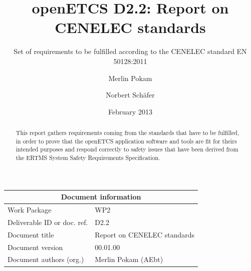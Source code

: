 \documentclass{template/openetcs_report}
\begin{document}
\frontmatter
{}




\title{openETCS D2.2: Report on CENELEC standards}

\subtitle{Set of requirements to be fulfilled according to the CENELEC standard EN 50128:2011}

\date{February 2013}

\author{Merlin Pokam \and Norbert Sch\"afer}






\begin{abstract}
This report gathers requirements coming from the standards that have to be fulfilled, in order to prove that the openETCS application software and tools are fit for theirs intended purposes and respond correctly to safety issues that have been derived from the ERTMS System Safety Requirements Specification.
\end{abstract}

\maketitle

\begin{tabular}{|p{4.4cm}|p{8.7cm}|}
\hline
\multicolumn{2}{|c|}{Document information} \\
\hline
Work Package &  WP2  \\
Deliverable ID or doc. ref. & D2.2\\
\hline
Document title & Report on CENELEC standards \\
Document version & 00.01.00 \\
Document authors (org.)  & Merlin Pokam (AEbt) \\
\hline
\end{tabular}
\end{document}

